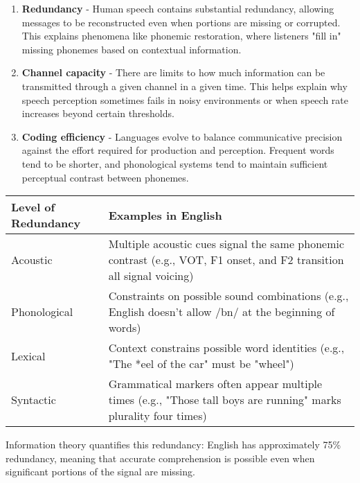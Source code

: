 \documentclass[12pt,a4paper]{article}
\begin{document}
\begin{enumerate}
\item \textbf{Redundancy} - Human speech contains substantial redundancy, allowing messages to be reconstructed even when portions are missing or corrupted. This explains phenomena like phonemic restoration, where listeners "fill in" missing phonemes based on contextual information.

\item \textbf{Channel capacity} - There are limits to how much information can be transmitted through a given channel in a given time. This helps explain why speech perception sometimes fails in noisy environments or when speech rate increases beyond certain thresholds.

\item \textbf{Coding efficiency} - Languages evolve to balance communicative precision against the effort required for production and perception. Frequent words tend to be shorter, and phonological systems tend to maintain sufficient perceptual contrast between phonemes.
\end{enumerate}

\begin{tcolorbox}[enhanced, colback=green!5, colframe=green!75!black, title=Redundancy in Natural Languages]
\begin{center}
\begin{tabular}{|p{4cm}|p{8cm}|}
\hline
\textbf{Level of Redundancy} & \textbf{Examples in English} \\
\hline
Acoustic & Multiple acoustic cues signal the same phonemic contrast (e.g., VOT, F1 onset, and F2 transition all signal voicing) \\
\hline
Phonological & Constraints on possible sound combinations (e.g., English doesn't allow /bn/ at the beginning of words) \\
\hline
Lexical & Context constrains possible word identities (e.g., "The *eel of the car" must be "wheel") \\
\hline
Syntactic & Grammatical markers often appear multiple times (e.g., "Those tall boys are running" marks plurality four times) \\
\hline
\end{tabular}
\end{center}
\small Information theory quantifies this redundancy: English has approximately 75\% redundancy, meaning that accurate comprehension is possible even when significant portions of the signal are missing.
\end{tcolorbox}
\end{document}

